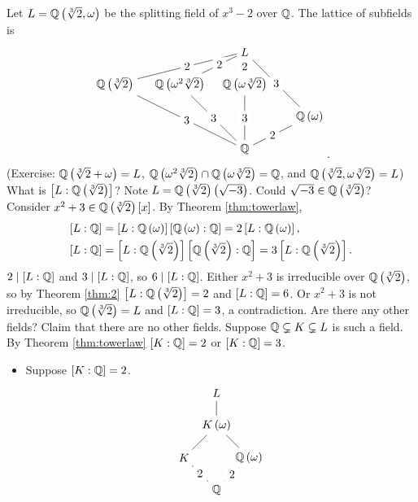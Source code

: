 \begin{example1}
Let $ L = \mathbb{Q}\left( \sqrt[3]{2}, \omega \right) $ be the splitting field of $ x^3 - 2 $ over $ \mathbb{Q} $. The lattice of subfields is
$$
\begin{tikzpicture}
\node (L) at (0, 3) {$ L $};
\node (K1) at (-4, 2) {$ \Q\rb{\sqrt[3]{2}} $};
\node (K2) at (-2, 2) {$ \Q\rb{\omega^2\sqrt[3]{2}} $};
\node (K3) at (-0, 2) {$ \Q\rb{\omega\sqrt[3]{2}} $};
\node (K) at (2, 1) {$ \Q\rb{\omega} $};
\node (Q) at (0, 0) {$ \Q $};
\draw (L) -- node[fill=white]{2} (K1) -- node[fill=white]{3} (Q);
\draw (L) -- node[fill=white]{2} (K2) -- node[fill=white]{3} (Q);
\draw (L) -- node[fill=white]{2} (K3) -- node[fill=white]{3} (Q);
\draw (L) -- node[fill=white]{3} (K) -- node[fill=white]{2} (Q);
\end{tikzpicture}.
$$
(Exercise: $ \mathbb{Q}\left( \sqrt[3]{2} + \omega \right) = L $, $ \mathbb{Q}\left( \omega^2\sqrt[3]{2} \right) \cap \mathbb{Q}\left( \omega\sqrt[3]{2} \right) = \mathbb{Q} $, and $ \mathbb{Q}\left( \sqrt[3]{2}, \omega\sqrt[3]{2} \right) = L $) What is $ \left[ L : \mathbb{Q}\left( \sqrt[3]{2} \right) \right] $? Note $ L = \mathbb{Q}\left( \sqrt[3]{2} \right)\left( \sqrt{-3} \right) $. Could $ \sqrt{-3} \in \mathbb{Q}\left( \sqrt[3]{2} \right) $? Consider $ x^2 + 3 \in \mathbb{Q}\left( \sqrt[3]{2} \right)\left[ x \right] $. By Theorem \ref{thm:towerlaw},
\begin{align*}
\left[ L : \mathbb{Q} \right] & = \left[ L : \mathbb{Q}\left( \omega \right) \right]\left[ \mathbb{Q}\left( \omega \right) : \mathbb{Q} \right] = 2\left[ L : \mathbb{Q}\left( \omega \right) \right], \\
\left[ L : \mathbb{Q} \right] & = \left[ L : \mathbb{Q}\left( \sqrt[3]{2} \right) \right]\left[ \mathbb{Q}\left( \sqrt[3]{2} \right) : \mathbb{Q} \right] = 3\left[ L : \mathbb{Q}\left( \sqrt[3]{2} \right) \right].
\end{align*}
$ 2 \mid \left[ L : \mathbb{Q} \right] $ and $ 3 \mid \left[ L : \mathbb{Q} \right] $, so $ 6 \mid \left[ L : \mathbb{Q} \right] $. Either $ x^2 + 3 $ is irreducible over $ \mathbb{Q}\left( \sqrt[3]{2} \right) $, so by Theorem \ref{thm:2} $ \left[ L : \mathbb{Q}\left( \sqrt[3]{2} \right) \right] = 2 $ and $ \left[ L : \mathbb{Q} \right] = 6 $. Or $ x^2 + 3 $ is not irreducible, so $ \mathbb{Q}\left( \sqrt[3]{2} \right) = L $ and $ \left[ L : \mathbb{Q} \right] = 3 $, a contradiction. Are there any other fields? Claim that there are no other fields. Suppose $ \mathbb{Q} \subsetneq K \subsetneq L $ is such a field. By Theorem \ref{thm:towerlaw} $ \left[ K : \mathbb{Q} \right] = 2 $ or $ \left[ K : \mathbb{Q} \right] = 3 $.
\begin{itemize}
\item Suppose $ \left[ K : \mathbb{Q} \right] = 2 $.
$$
\begin{tikzpicture}
\node (L) at (0, 2) {$ L $};
\node (K') at (0, 1) {$ K\rb{\omega} $};
\node (K) at (-1, 0) {$ K $};
\node (Q') at (1, 0) {$ \Q\rb{\omega} $};
\node (Q) at (0, -1) {$ \Q $};
\draw (L) -- (K');
\draw (K') -- (K) -- node[fill=white]{2} (Q);
\draw (K') -- (Q') -- node[fill=white]{2} (Q);
\end{tikzpicture}
$$
\end{itemize}
\end{example1}
